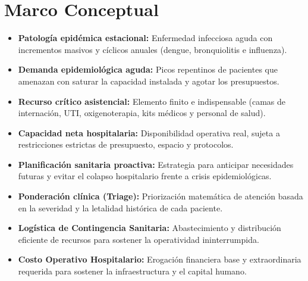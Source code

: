 \documentclass[conference]{IEEEtran}
\begin{document}
\section{Marco Conceptual}
\begin{itemize}
    \item \textbf{Patología epidémica estacional:} Enfermedad infecciosa aguda con incrementos masivos y cíclicos anuales (dengue, bronquiolitis e influenza).
    \item \textbf{Demanda epidemiológica aguda:} Picos repentinos de pacientes que amenazan con saturar la capacidad instalada y agotar los presupuestos.
    \item \textbf{Recurso crítico asistencial:} Elemento finito e indispensable (camas de internación, UTI, oxigenoterapia, kits médicos y personal de salud).
    \item \textbf{Capacidad neta hospitalaria:} Disponibilidad operativa real, sujeta a restricciones estrictas de presupuesto, espacio y protocolos.
    \item \textbf{Planificación sanitaria proactiva:} Estrategia para anticipar necesidades futuras y evitar el colapso hospitalario frente a crisis epidemiológicas.
    \item \textbf{Ponderación clínica (Triage):} Priorización matemática de atención basada en la severidad y la letalidad histórica de cada paciente.

    \item \textbf{Logística de Contingencia Sanitaria:} Abastecimiento y distribución eficiente de recursos para sostener la operatividad ininterrumpida.
    \item \textbf{Costo Operativo Hospitalario:} Erogación financiera base y extraordinaria requerida para sostener la infraestructura y el capital humano.
\end{itemize}
\end{document}
